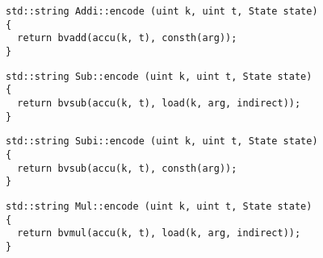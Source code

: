 
\begin{lstlisting}[style=c++, style=encode]
std::string Addi::encode (uint k, uint t, State state)
{
  return bvadd(accu(k, t), consth(arg));
}
\end{lstlisting}


\begin{lstlisting}[style=c++, style=encode]
std::string Sub::encode (uint k, uint t, State state)
{
  return bvsub(accu(k, t), load(k, arg, indirect));
}
\end{lstlisting}


\begin{lstlisting}[style=c++, style=encode]
std::string Subi::encode (uint k, uint t, State state)
{
  return bvsub(accu(k, t), consth(arg));
}
\end{lstlisting}


\newpage

\begin{lstlisting}[style=c++, style=encode]
std::string Mul::encode (uint k, uint t, State state)
{
  return bvmul(accu(k, t), load(k, arg, indirect));
}
\end{lstlisting}

